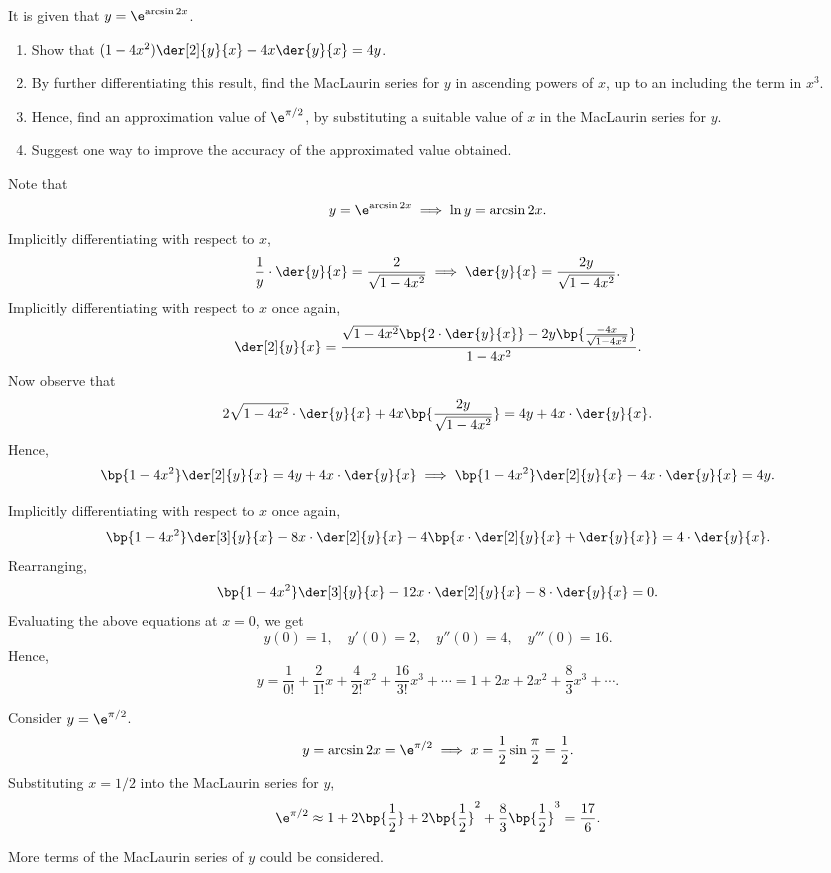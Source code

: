 \begin{problem}
    It is given that $y = \e^{\arcsin 2x}$.
                
    \begin{enumerate}
        \item Show that $(1-4x^2)\der[2]{y}{x} - 4x\der{y}{x}=4y$.
        \item By further differentiating this result, find the MacLaurin series for $y$ in ascending powers of $x$, up to an including the term in $x^3$.
        \item Hence, find an approximation value of $\e^{\pi/2}$, by substituting a suitable value of $x$ in the MacLaurin series for $y$.
        \item Suggest one way to improve the accuracy of the approximated value obtained.
    \end{enumerate}
\end{problem}
\begin{solution}
    \begin{ppart}
        Note that \[y = \e^{\arcsin{2x}} \implies \ln y = \arcsin{2x}.\] Implicitly differentiating with respect to $x$, \[\frac1y \cdot \der{y}{x} = \frac2{\sqrt{1 - 4x^2}} \implies \der{y}{x} = \frac{2y}{\sqrt{1 - 4x^2}}.\] Implicitly differentiating with respect to $x$ once again, \[\der[2]{y}{x} = \frac{\sqrt{1 - 4x^2} \bp{2 \cdot \der{y}{x}} - 2y \bp{\frac{-4x}{\sqrt{1 - 4x^2}}}}{1 - 4x^2}.\] Now observe that \[2\sqrt{1 - 4x^2} \cdot \der{y}{x} + 4x \bp{\frac{2y}{\sqrt{1 - 4x^2}}} = 4y + 4x \cdot \der{y}{x}.\] Hence, \[\bp{1 - 4x^2}\der[2]{y}{x} = 4y + 4x\cdot\der{y}{x} \implies \bp{1-4x^2}\der[2]{y}{x} - 4x \cdot \der{y}{x} = 4y.\]
    \end{ppart}
    \begin{ppart}
        Implicitly differentiating with respect to $x$ once again, \[\bp{1 - 4x^2} \der[3]{y}{x} -8x \cdot \der[2]{y}{x} -4 \bp{x \cdot \der[2]{y}{x} + \der{y}{x}} = 4\cdot \der{y}{x}.\] Rearranging, \[\bp{1 - 4x^2} \der[3]{y}{x} -12x \cdot \der[2]{y}{x} - 8 \cdot\der{y}{x} = 0.\] Evaluating the above equations at $x = 0$, we get \[y(0) = 1, \quad y'(0) = 2, \quad y''(0) = 4, \quad y'''(0) = 16.\] Hence, \[y = \frac{1}{0!} + \frac{2}{1!}x + \frac{4}{2!}x^2 + \frac{16}{3!}x^3 + \cdots = 1 + 2x + 2x^2 + \frac83 x^3 + \cdots.\]
    \end{ppart}
    \begin{ppart}
        Consider $y = \e^{\pi/2}$. \[y = \arcsin 2x = \e^{\pi/2} \implies x = \frac12 \sin \frac\pi2 = \frac12.\] Substituting $x = 1/2$ into the MacLaurin series for $y$, \[\e^{\pi/2} \approx 1 + 2\bp{\frac12} + 2\bp{\frac12}^2 + \frac83 \bp{\frac12}^3 = \frac{17}6.\]
    \end{ppart}
    \begin{ppart}
        More terms of the MacLaurin series of $y$ could be considered.
    \end{ppart}
\end{solution}

